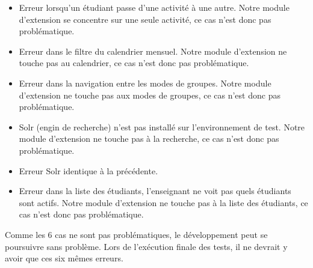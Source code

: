 \begin{itemize}
  \item Erreur lorsqu'un étudiant passe d'une activité à une autre.
        Notre module d'extension se concentre sur une seule activité, ce cas n'est donc pas problématique.
        
  \item Erreur dans le filtre du calendrier mensuel.
        Notre module d'extension ne touche pas au calendrier, ce cas n'est donc pas problématique.
        
  \item Erreur dans la navigation entre les modes de groupes.
        Notre module d'extension ne touche pas aux modes de groupes, ce cas n'est donc pas problématique.
        
  \item Solr (engin de recherche) n'est pas installé sur l'environnement de test.
        Notre module d'extension ne touche pas à la recherche, ce cas n'est donc pas problématique.
        
  \item Erreur Solr identique à la précédente.
  
  \item Erreur dans la liste des étudiants, l'enseignant ne voit pas quels étudiants sont actifs.
        Notre module d'extension ne touche pas à la liste des étudiants, ce cas n'est donc pas problématique.
\end{itemize}

Comme les 6 cas ne sont pas problématiques, le développement peut se poursuivre sans problème.
Lors de l'exécution finale des tests, il ne devrait y avoir que ces six mêmes erreurs.